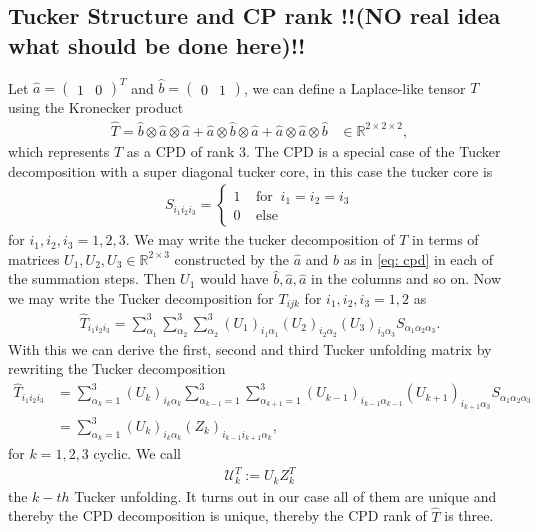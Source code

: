 \documentclass[a4paper]{article}
\begin{document}
\subsection{Tucker Structure and CP rank !!(NO real idea what  should be
done here)!!}
Let $\hat{a} = \begin{pmatrix}1 & 0\end{pmatrix}^T$ and $\hat{b} =
\begin{pmatrix}0 & 1\end{pmatrix}$, we can define a Laplace-like tensor $T$
using the Kronecker product
\begin{align}\label{eq: cpd}
    \hat{T} = \hat{b}\otimes \hat{a} \otimes \hat{a}+
        \hat{a}\otimes \hat{b} \otimes \hat{a}+
        \hat{a}\otimes \hat{a} \otimes \hat{b} \;\;\; \in
        \mathbb{R}^{2\times2\times2},
\end{align}
which represents $T$ as a CPD of rank 3. The CPD is a special case of the
Tucker decomposition with a super diagonal tucker core, in this case the
tucker core is
\begin{align}
    S_{i_1i_2i_3} = \begin{cases}
                    1\;\;\;\; \text{for} \;\; i_1=i_2=i_3\\
                    0\;\;\;\; \text{else}
                \end{cases}
\end{align}
for $i_1, i_2, i_3 = 1,2,3$. We may write the tucker decomposition of $T$ in
terms of matrices $U_1, U_2, U_3 \in \mathbb{R}^{2\times 3}$ constructed by
the $\hat{a}$ and $\hat{b}$ as in \ref{eq: cpd} in each of the summation
steps.  Then $U_1$ would have $\hat{b}, \hat{a}, \hat{a}$ in the columns and
so on.  Now we may write the Tucker decomposition for $T_{ijk}$ for $i_1,
i_2,i_3
= 1, 2$ as
\begin{align}
    \hat{T}_{i_1i_2i_3} = \sum_{\alpha_1}^3\sum_{\alpha_2}^3\sum_{\alpha_2}^3
    (U_1)_{i_1\alpha_1} (U_2)_{i_2\alpha_2}  (U_3)_{i_3\alpha_3}
    S_{\alpha_1\alpha_2\alpha_3}.
\end{align}
With this we can derive the first, second and third Tucker unfolding matrix
by rewriting the Tucker decomposition
\begin{align}
    \hat{T}_{i_1i_2i_3} &=
    \sum_{\alpha_k = 1}^3 (U_k)_{i_k\alpha_k} \sum_{\alpha_{k-1}=1}^3
    \sum_{\alpha_{k+1}=1}^3(U_{k-1})_{i_{k-1}\alpha_{k-1}}
    (U_{k+1})_{i_{k+1}\alpha_3}S_{\alpha_1 \alpha_2 \alpha_3}\\
                  &=
    \sum_{\alpha_k = 1}^3 (U_k)_{i_k\alpha_k} (Z_k)_{i_{k-1}i_{k+1}\alpha_k},
\end{align}
for $k=1, 2, 3$ cyclic. We call
\begin{align}
    \mathcal{U}^T_k := U_k Z_k^T
\end{align}
the $k-th$ Tucker unfolding. It turns out in our case all of them are unique
and thereby the CPD decomposition is unique, thereby the CPD rank of
$\hat{T}$ is three.
\end{document}
